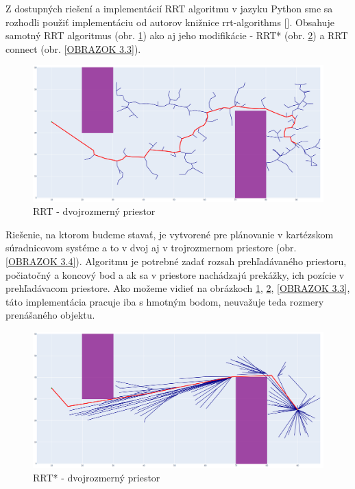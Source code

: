 Z dostupných riešení a implementácií RRT algoritmu v jazyku Python sme sa rozhodli použiť implementáciu od autorov knižnice rrt-algorithms []. Obsahuje samotný RRT algoritmus (obr. \ref{OBRAZOK 3.1}) ako aj jeho modifikácie - RRT* (obr. \ref{OBRAZOK 3.2}) a RRT connect (obr. \ref{OBRAZOK 3.3}).

\begin{figure}[]
	\centering
	\includegraphics[width=140mm]{img/RRT-2D.png}
	\caption{RRT - dvojrozmerný priestor} \label{OBRAZOK 3.1} 
\end{figure} 
Riešenie, na ktorom budeme stavať, je vytvorené pre plánovanie v kartézskom súradnicovom systéme a to v dvoj aj v trojrozmernom priestore (obr. \ref{OBRAZOK 3.4}). Algoritmu je potrebné zadať rozsah prehľadávaného priestoru, počiatočný a koncový bod a ak sa v priestore nachádzajú prekážky, ich pozície v prehľadávacom priestore. Ako možeme vidieť na obrázkoch \ref{OBRAZOK 3.1}, \ref{OBRAZOK 3.2}, \ref{OBRAZOK 3.3}, táto implementácia pracuje iba s hmotným bodom, neuvažuje teda rozmery prenášaného objektu.
\begin{figure}[]
	\centering
	\includegraphics[width=140mm]{img/RRTstar-2D.png}
	\caption{RRT* - dvojrozmerný priestor} \label{OBRAZOK 3.2} 
\end{figure} 


